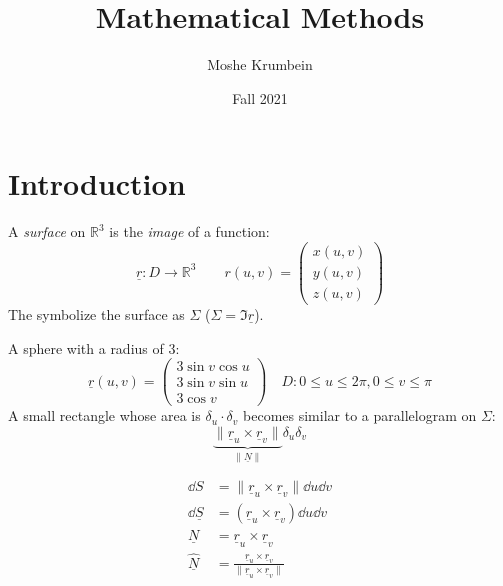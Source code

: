 \documentclass[00_complete]{sub files}
\title{Mathematical Methods}
\author{Moshe Krumbein}
\date{Fall 2021}
\begin{document}
\section{Introduction}

\begin{reminder}
    A \emph{surface} on $\mathbb{R}^3$ is the \emph{image} of a function:
        $$\underline r: D\to \mathbb{R}^3 \qquad r(u,v)=\begin{pmatrix}
            x(u,v) \\ y(u,v) \\ z(u,v)
        \end{pmatrix}$$
    The symbolize the surface as $\Sigma$ ($\Sigma = \Im \underline r$).
\end{reminder}
\begin{example}
    A sphere with a radius of $3$:
    $$\underline r (u,v) = \begin{pmatrix}
        3 \sin v \cos u \\ 3 \sin v \sin u \\ 3 \cos v
    \end{pmatrix} \quad D: 0 \leq u \leq 2\pi, 0 \leq v \leq \pi$$
    A small rectangle whose area is $\delta_u \cdot \delta_v$ becomes similar
    to a parallelogram on $\Sigma$:
    $$\underbrace{\|\underline r_u \times \underline r_v\|}_{\|\underline N\|}\delta_u\delta_v$$
\end{example}
\begin{symbols}
    \begin{align*}
        \dd{S}&=\|\underline r_u \times \underline r_v\|\dd{u}\dd{v} \\
        \dd{\underline S} &= (\underline r_u \times \underline r_v)\dd{u}\dd{v}
        \\
        \underline N &= \underline r_u \times \underline r_v \\
        \underline{\hat N} &= \frac{\underline r_u \times \underline
        r_v}{\|\underline r_u \times \underline r_v\|} \\
    \end{align*}
\end{symbols}
\end{document}
